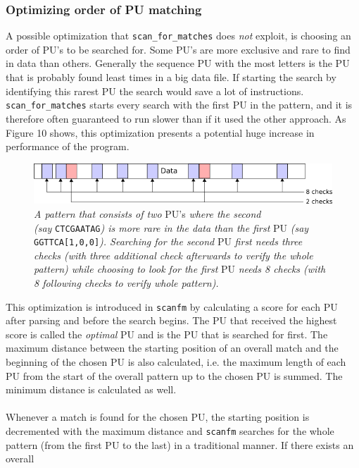 \documentclass[12pt]{article}
\newcommand{\scm}{\texttt{scan\_for\_matches} }
\newcommand{\sfm}{\texttt{scanfm} }
\newcommand{\pu}{PU }
\newcommand{\pus}{PU's }
\begin{document}
\subsubsection{Optimizing order of \pu matching}
A possible optimization that \scm does \textit{not} exploit, is choosing an order of \pus to be searched for.
Some \pus are more exclusive and rare to find in data than others. Generally the sequence \pu with the most
letters is the \pu that is probably found least times in a big data file. If starting the search by
identifying this rarest \pu the search would save a lot of instructions. \scm starts every search with the 
first \pu in the pattern, and it is therefore often guaranteed to run slower than if it used the other approach.
As Figure 10 shows, this optimization presents a potential huge increase in performance of the program.
\begin{figure}[H]
\begin{center}
\includegraphics[scale=0.8]{Diagrams/opti.png}
\end{center}
\caption{\textit{A pattern that consists of two} \pus \textit{where the second \\(say}
\texttt{CTCGAATAG}\textit{) is more rare in the data than the first} \pu \textit{(say }\texttt{GGTTCA[1,0,0]}\textit{). 
Searching for the 
second} \pu \textit{first needs three checks (with three additional check afterwards to verify the whole pattern)
while choosing to look for the first} \pu \textit{needs 8 checks (with 8 following checks to verify whole pattern).}}
\end{figure}
\noindent This optimization is introduced in \sfm by calculating a score for each \pu after parsing and before
the search begins. The \pu that received the highest score is called the \emph{optimal} \pu and is 
the \pu that is searched for first. The maximum
distance between the starting position of an overall match and the beginning of the chosen \pu is also calculated, i.e.
the maximum length of each \pu from the start of the overall pattern up to the chosen \pu is summed. The minimum
distance is calculated as well. \\ \\
Whenever a match is found for the chosen PU, the starting position is decremented with the maximum distance and 
\sfm searches for the whole pattern (from the first \pu to the last) in a traditional manner. If there exists an overall
\end{document}
